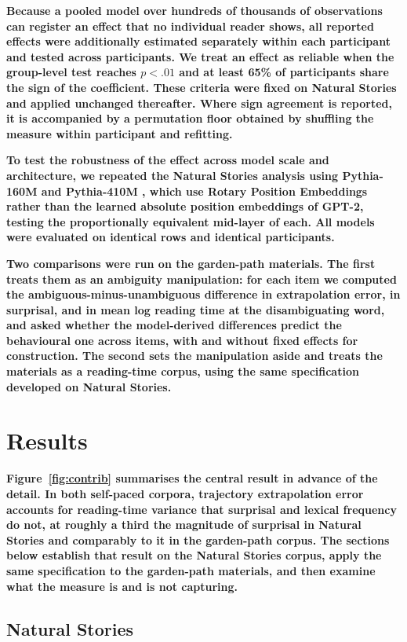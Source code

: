 \documentclass[12pt]{article}
\newcommand{\new}[1]{{\bfseries #1}}
\begin{document}
\new{Because a pooled model over hundreds of thousands of observations can register an effect that no individual reader shows, all reported effects were additionally estimated separately within each participant and tested across participants. We treat an effect as reliable when the group-level test reaches $p < .01$ and at least 65\% of participants share the sign of the coefficient. These criteria were fixed on Natural Stories and applied unchanged thereafter. Where sign agreement is reported, it is accompanied by a permutation floor obtained by shuffling the measure within participant and refitting.}

\new{To test the robustness of the effect across model scale and architecture, we repeated the Natural Stories analysis using Pythia-160M and Pythia-410M \citep{biderman2023}, which use Rotary Position Embeddings rather than the learned absolute position embeddings of GPT-2, testing the proportionally equivalent mid-layer of each. All models were evaluated on identical rows and identical participants.}

\new{Two comparisons were run on the garden-path materials. The first treats them as an ambiguity manipulation: for each item we computed the ambiguous-minus-unambiguous difference in extrapolation error, in surprisal, and in mean log reading time at the disambiguating word, and asked whether the model-derived differences predict the behavioural one across items, with and without fixed effects for construction. The second sets the manipulation aside and treats the materials as a reading-time corpus, using the same specification developed on Natural Stories.}

\section{Results}

\new{Figure~\ref{fig:contrib} summarises the central result in advance of the
detail. In both self-paced corpora, trajectory extrapolation error accounts for
reading-time variance that surprisal and lexical frequency do not, at roughly a
third the magnitude of surprisal in Natural Stories and comparably to it in the
garden-path corpus. The sections below establish that result on the Natural
Stories corpus, apply the same specification to the garden-path materials, and
then examine what the measure is and is not capturing.}

\subsection{Natural Stories}
\end{document}
